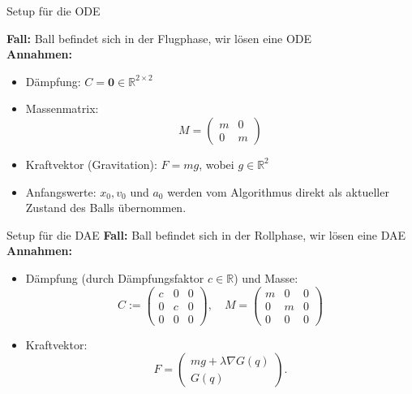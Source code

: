 \documentclass[aspectratio=169]{beamer}
\begin{document}
\begin{frame}{Setup für die ODE}

\textbf{Fall:} Ball befindet sich in der Flugphase, wir lösen eine ODE\\
\vspace{0.3cm}
\textbf{Annahmen:}
	\begin{itemize}
		\item Dämpfung: $C = \mathbf{0} \in \mathbb{R}^{2 \times 2}$
		\item Massenmatrix:
		\[
		M =
		\begin{pmatrix}
			m & 0 \\
			0 & m
		\end{pmatrix}
		\]
		\item Kraftvektor (Gravitation): \quad $F = m g$, \quad wobei $g \in \mathbb{R}^2$
		\item Anfangswerte: $x_0, v_0$ und $a_0$ werden vom Algorithmus direkt als aktueller Zustand des Balls übernommen.
	\end{itemize}

\end{frame}

\begin{frame}{Setup für die DAE}
\textbf{Fall:} Ball befindet sich in der Rollphase, wir lösen eine DAE\\
\vspace{0.3cm}
\textbf{Annahmen:}
\begin{itemize}
	\item Dämpfung (durch Dämpfungsfaktor $c \in \mathbb{R}$) und Masse:
	\begin{equation*}
		C :=
		\begin{pmatrix}
			c & 0 & 0\\
			0 & c & 0\\
			0 & 0 & 0
		\end{pmatrix},
		\quad
		M =
		\begin{pmatrix}
			m & 0 & 0 \\
			0 & m & 0 \\
			0 & 0 & 0
		\end{pmatrix}
	\end{equation*}
	\item Kraftvektor:
	\[F =
	\begin{pmatrix}
		mg + \lambda \nabla G(q)\\
		G(q)
	\end{pmatrix}.
	\]
\end{itemize}

\end{frame}
\end{document}
